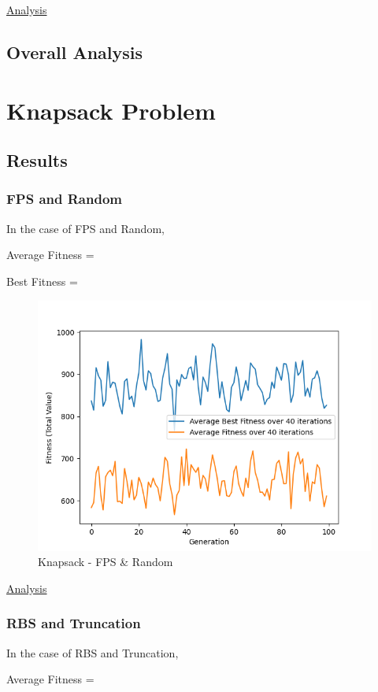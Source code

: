 \documentclass[11pt, letterpaper]{article}
\begin{document}
\underline{Analysis}

\subsection {Overall Analysis}

\newpage

\section{Knapsack Problem}

\subsection{Results} 
\subsubsection {FPS and Random}
In the case of FPS and Random,

Average Fitness =

Best Fitness = 
\begin{figure}[H]
    \centering
    \includegraphics[scale = 0.6]{images/knapsack_fp_rd.png}
    \caption {Knapsack - FPS \& Random}
    \label {fig:kpFR}
\end{figure}
\underline{Analysis}
\subsubsection {RBS and Truncation}
In the case of RBS and Truncation,

Average Fitness = 
\end{document}
